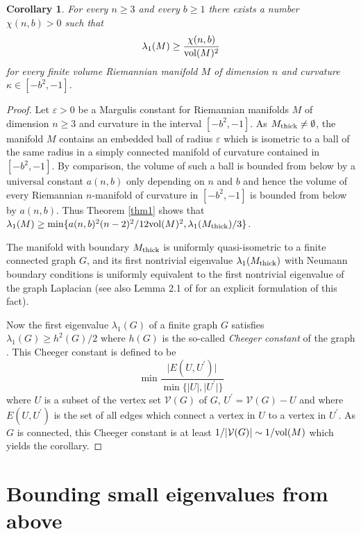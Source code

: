 \documentclass[11pt]{amsart}
\theoremstyle{plain}
\theoremstyle{plain}
\newtheorem{corollary}[theorem]{Corollary}
\theoremstyle{definition}
\renewcommand{\epsilon}{\varepsilon}
\newcommand{\cal}{\mathcal}
\begin{document}
\begin{corollary}\label{eigenbelow}
For every $n\geq 3$ and every $b\geq 1$ 
there exists a number $\chi(n,b)>0$ such that 
\[\lambda_1(M)\geq \frac{\chi(n,b)}{{\rm vol}(M)^2}\]
for every finite volume Riemannian manifold $M$ of 
dimension $n$ and curvature
$\kappa\in [-b^2,-1]$. 
\end{corollary}
\begin{proof} Let $\epsilon >0$ be a Margulis constant for Riemannian 
manifolds $M$ of dimension $n\geq 3$ and curvature in the interval
$[-b^2,-1]$. As $M_{\rm thick}\not=\emptyset$, the manifold $M$ contains
an embedded ball of radius $\epsilon$ which is isometric to a ball of the
same radius in a simply connected manifold of curvature contained in 
$[-b^2,-1]$. By comparison, the volume of such a ball is bounded from 
below by a universal constant $a(n,b)$ only depending on $n$ and $b$ and hence
the volume of every Riemannian $n$-manifold of curvature in $[-b^2,-1]$ is bounded 
from below by 
$a(n,b)$. 
Thus Theorem \ref{thm1} shows that 
$\lambda_1(M)\geq \min\{a(n,b)^2(n-2)^2/12{\rm vol}(M)^2,
\lambda_1(M_{\rm thick})/3\}$.


The manifold with boundary $M_{\rm thick}$ 
is uniformly quasi-isometric to a finite connected graph $G$,
and its first nontrivial eigenvalue 
$\lambda_1(M_{\rm thick})$ with Neumann boundary conditions
is uniformly equivalent to the first nontrivial eigenvalue of the 
graph Laplacian \cite{Man05} (see also Lemma 2.1 of \cite{LS12} for an explicit
formulation of this fact). 


Now the first eigenvalue $\lambda_1(G)$ 
of a finite graph $G$ satisfies $\lambda_1(G)\geq h^2(G)/2$ where
$h(G)$ is the so-called \emph{Cheeger constant} of the graph \cite{Chu96}.
This Cheeger constant is defined to be 
\[\min\frac{\vert E(U,U^\prime)\vert}{\min\{\vert U\vert,\vert U^\prime\vert\}}\]
where $U$ is a subset of the vertex set ${\mathcal V}(G)$ of $G$, 
$U^\prime={\mathcal V}(G)-U$ and where $E(U,U^\prime)$ is the set of 
all edges which connect a vertex in $U$ to a vertex in $U^\prime$. 
As $G$ is connected, 
this Cheeger constant is at least $1/\vert {\cal V}(G)\vert \sim
1/{\rm vol}(M)$ which yields the corollary. 
\end{proof}





\section{Bounding small eigenvalues from above}\label{above}
\end{document}
